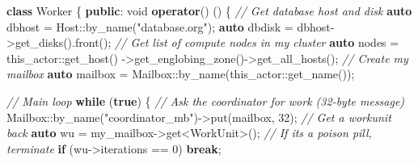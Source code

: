 \documentclass[
]{article}
\newenvironment{Shaded}{}{}
\newcommand{\CommentTok}[1]{\textcolor[rgb]{0.38,0.63,0.69}{\textit{#1}}}
\newcommand{\ControlFlowTok}[1]{\textcolor[rgb]{0.00,0.44,0.13}{\textbf{#1}}}
\newcommand{\DataTypeTok}[1]{\textcolor[rgb]{0.56,0.13,0.00}{#1}}
\newcommand{\DecValTok}[1]{\textcolor[rgb]{0.25,0.63,0.44}{#1}}
\newcommand{\KeywordTok}[1]{\textcolor[rgb]{0.00,0.44,0.13}{\textbf{#1}}}
\newcommand{\NormalTok}[1]{#1}
\newcommand{\OperatorTok}[1]{\textcolor[rgb]{0.40,0.40,0.40}{#1}}
\newcommand{\StringTok}[1]{\textcolor[rgb]{0.25,0.44,0.63}{#1}}
\begin{document}
\begin{Shaded}
\begin{Highlighting}[]
\KeywordTok{class}\NormalTok{ Worker }\OperatorTok{\{}
    \KeywordTok{public}\OperatorTok{:}
    \DataTypeTok{void} \KeywordTok{operator}\OperatorTok{()} \OperatorTok{()} \OperatorTok{\{}
    \CommentTok{// Get database host and disk}
    \KeywordTok{auto}\NormalTok{ dbhost }\OperatorTok{=}\NormalTok{ Host}\OperatorTok{::}\NormalTok{by\_name}\OperatorTok{(}\StringTok{"database.org"}\OperatorTok{);}
    \KeywordTok{auto}\NormalTok{ dbdisk }\OperatorTok{=}\NormalTok{ dbhost}\OperatorTok{{-}\textgreater{}}\NormalTok{get\_disks}\OperatorTok{().}\NormalTok{front}\OperatorTok{();}
    \CommentTok{// Get list of compute nodes in my cluster}
    \KeywordTok{auto}\NormalTok{ nodes }\OperatorTok{=}\NormalTok{ this\_actor}\OperatorTok{::}\NormalTok{get\_host}\OperatorTok{()}
    \OperatorTok{{-}\textgreater{}}\NormalTok{get\_englobing\_zone}\OperatorTok{(){-}\textgreater{}}\NormalTok{get\_all\_hosts}\OperatorTok{();}
    \CommentTok{// Create my mailbox}
    \KeywordTok{auto}\NormalTok{ mailbox }\OperatorTok{=}\NormalTok{ Mailbox}\OperatorTok{::}\NormalTok{by\_name}\OperatorTok{(}\NormalTok{this\_actor}\OperatorTok{::}\NormalTok{get\_name}\OperatorTok{());}

    \CommentTok{// Main loop}
    \ControlFlowTok{while} \OperatorTok{(}\KeywordTok{true}\OperatorTok{)} \OperatorTok{\{}
    \CommentTok{// Ask the coordinator for work (32{-}byte message)}
\NormalTok{    Mailbox}\OperatorTok{::}\NormalTok{by\_name}\OperatorTok{(}\StringTok{"coordinator\_mb"}\OperatorTok{){-}\textgreater{}}\NormalTok{put}\OperatorTok{(}\NormalTok{mailbox}\OperatorTok{,} \DecValTok{32}\OperatorTok{);}
    \CommentTok{// Get a workunit back}
    \KeywordTok{auto}\NormalTok{ wu }\OperatorTok{=}\NormalTok{ my\_mailbox}\OperatorTok{{-}\textgreater{}}\NormalTok{get}\OperatorTok{\textless{}}\NormalTok{WorkUnit}\OperatorTok{\textgreater{}();}
    \CommentTok{// If it\textquotesingle{}s a poison pill, terminate}
    \ControlFlowTok{if} \OperatorTok{(}\NormalTok{wu}\OperatorTok{{-}\textgreater{}}\NormalTok{iterations }\OperatorTok{==} \DecValTok{0}\OperatorTok{)} \ControlFlowTok{break}\OperatorTok{;}


\end{Highlighting}
\end{Shaded}
\end{document}
